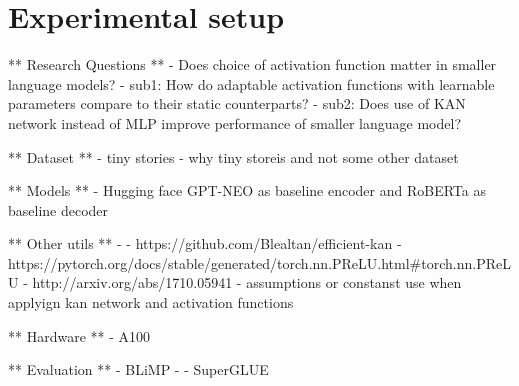 
\section{Experimental setup}
** Research Questions **
- Does choice of activation function matter in smaller language models?
- sub1: How do adaptable activation functions with learnable parameters compare to their static counterparts?
- sub2: Does use of KAN network instead of MLP improve performance of smaller language model?

** Dataset ** 
- tiny stories
- why tiny storeis and not some other dataset 

** Models ** 
- Hugging face GPT-NEO as baseline encoder and RoBERTa as baseline decoder

** Other utils ** 
- %
- https://github.com/Blealtan/efficient-kan
- https://pytorch.org/docs/stable/generated/torch.nn.PReLU.html#torch.nn.PReLU
- http://arxiv.org/abs/1710.05941
- assumptions or constanst use when applyign kan network and activation functions 

** Hardware ** 
- A100

** Evaluation ** 
- BLiMP - %
- SuperGLUE